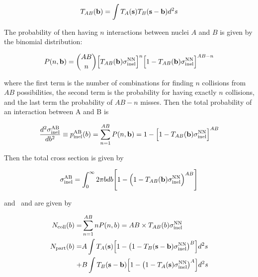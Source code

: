 \begin{align}
T_{AB}({\bf b}) = \int T_{A} ({\bf s}) T_{B} ({\bf s-\bf b}) d^2 s
\end{align}

The probability of then having $n$ interactions between nuclei $A$ and $B$ is given by the binomial distribution:

\begin{align}
P(n, { \bf b}) = {{AB} \choose {n}} \Big[T_{AB}( {\bf b} ) \sigma_{\mathrm{inel}}^{\mathrm{NN}} \Big]^n \Big[ 1 - T_{AB}( {\bf b} ) \sigma_{\mathrm{inel}}^{\mathrm{NN}} \Big]^{AB-n}
\end{align}

where the first term is the number of combinations for finding $n$ collisions from $AB$ possibilities, the second term is the probability for
having exactly $n$ collisions, and the last term the probability of $AB-n$ misses. Then the total probability of an interaction between A and B is 


\begin{align}
\frac{d^2  \sigma_{\mathrm{inel}}^{\mathrm{AB}} }{db^2} \equiv p_{\mathrm{inel}}^{\mathrm{AB}} (b) = \sum_{n=1}^{AB} P(n, {\bf b}) = 1- \Big[ 1 - T_{AB}( {\bf b} ) \sigma_{\mathrm{inel}}^{\mathrm{NN}} \Big]^{AB}
\end{align}

Then the total cross section is given by

\begin{align}
\sigma_{\mathrm{inel}}^{\mathrm{AB}} = \int_0^\infty 2\pi b db \Bigg[ 1- \Big( 1 - T_{AB}( {\bf b} ) \sigma_{\mathrm{inel}}^{\mathrm{NN}}  \Big)^{AB} \Bigg]
\end{align}

and \Ncoll\ and \Npart are given by \cite{Kharzeev:2000ph, Bialas:1976ed}

\begin{align}
\mbox{$N_{\mathrm{coll}}$} (b) = & \sum_{n=1}^{AB} n P(n, b) =  AB \times T_{AB}(b) \sigma_{\mathrm{inel}}^{\mathrm{NN}} \\
\mbox{$N_{\mathrm{part}}$} (b) = & A \int T_A ({\bf s}) \Big[ 1 - \big(1-T_B ({\bf s - b}) \sigma_{\mathrm{inel}}^{\mathrm{NN}} \big)^B \Big] d^2 s \\
+ & B \int T_B ({\bf s-b}) \Big[ 1 - \big(1-T_A ({\bf s}) \sigma_{\mathrm{inel}}^{\mathrm{NN}} \big)^A \Big] d^2 s \nonumber
\end{align}

